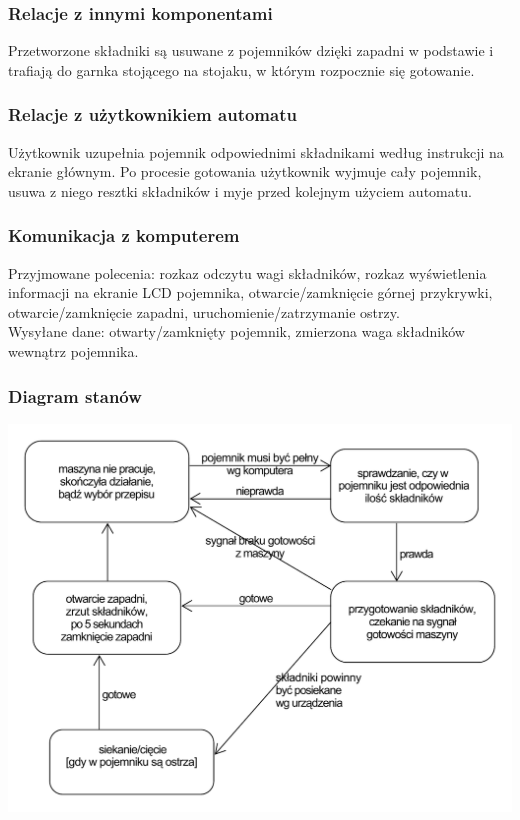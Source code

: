 \documentclass[12pt,a4paper,notitlepage]{report}
\begin{document}
\subsubsection{Relacje z innymi komponentami}
Przetworzone składniki są usuwane z pojemników dzięki zapadni w podstawie i trafiają do garnka stojącego na stojaku, w którym rozpocznie się gotowanie.

\subsubsection{Relacje z użytkownikiem automatu}
Użytkownik uzupełnia pojemnik odpowiednimi składnikami według instrukcji na ekranie głównym. Po procesie gotowania użytkownik wyjmuje cały pojemnik, usuwa z niego resztki składników i myje przed kolejnym użyciem automatu.

\subsubsection{Komunikacja z komputerem}
Przyjmowane polecenia: rozkaz odczytu wagi składników, rozkaz wyświetlenia informacji na ekranie LCD pojemnika, otwarcie/zamknięcie górnej przykrywki, otwarcie/zamknięcie zapadni, uruchomienie/zatrzymanie ostrzy.\\
Wysyłane dane: otwarty/zamknięty pojemnik, zmierzona waga składników wewnątrz pojemnika.

\subsubsection{Diagram stanów}
\includegraphics[width=\textwidth,height=\textheight,keepaspectratio=true]{Diagram-stanow-pojemnik.pdf}
\end{document}
